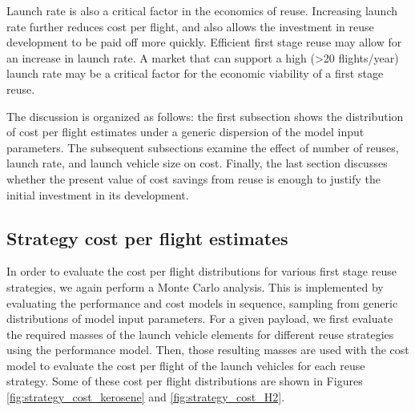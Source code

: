 \documentclass[conf]{new-aiaa}
\begin{document}
\begin{multicols}{2}
Launch rate is also a critical factor in the economics of reuse. Increasing launch rate further reduces cost per flight, and also allows the investment in reuse development to be paid off more quickly. Efficient first stage reuse may allow for an increase in launch rate. A market that can support a high (>20 flights/year) launch rate may be a critical factor for the economic viability of a first stage reuse.

The discussion is organized as follows: the first subsection shows the distribution of cost per flight estimates under a generic dispersion of the model input parameters. The subsequent subsections examine the effect of number of reuses, launch rate, and launch vehicle size on cost. Finally, the last section discusses whether the present value of cost savings from reuse is enough to justify the initial investment in its development.

\subsection{Strategy cost per flight estimates}

In order to evaluate the cost per flight distributions for various first stage reuse strategies, we again perform a Monte Carlo analysis. This is implemented by evaluating the performance and cost models in sequence, sampling from generic distributions of model input parameters. For a given payload, we first evaluate the required masses of the launch vehicle elements for different reuse strategies using the performance model. Then, those resulting masses are used with the cost model to evaluate the cost per flight of the launch vehicles for each reuse strategy. Some of these cost per flight distributions are shown in Figures \ref{fig:strategy_cost_kerosene} and \ref{fig:strategy_cost_H2}. 


\end{multicols}
\end{document}
